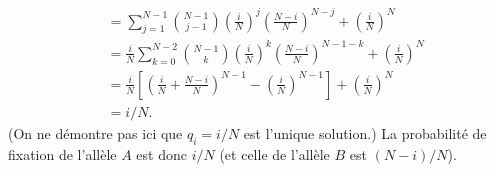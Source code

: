{\begin{description}
\begin{align*}
      & = \sum_{j=1}^{N-1} \binom{N-1}{j-1} \left(\frac{i}N\right)^j \left(\frac{N-i} N\right)^{N-j} + \left(\frac{i}N\right)^N \\
      & = \frac{i}N \sum_{k=0}^{N-2} \binom{N-1}{k} \left(\frac{i}N\right)^k \left(\frac{N-i} N\right)^{N-1-k} + \left(\frac{i}N\right)^N \\
      & = \frac{i}N \left[\left(\frac{i}N + \frac{N-i}N\right)^{N-1} - \left(\frac{i}N\right)^{N-1}\right] + \left(\frac{i}N\right)^N \\
      & = i/N.
    \end{align*}
    (On ne démontre pas ici que $q_i = i/N$ est l'unique solution.) La probabilité de fixation de l'allèle $A$ est donc $i/N$ (et celle de l'allèle $B$ est $(N-i)/N$).
  \end{description}
  
}



